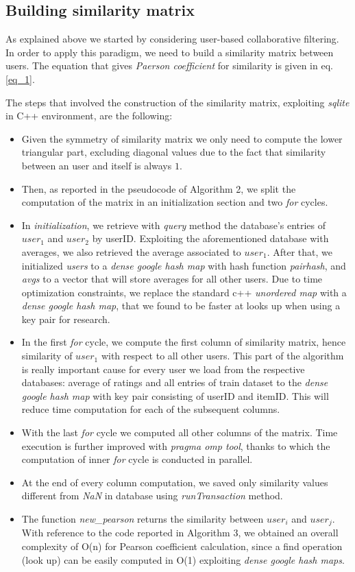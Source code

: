 \subsection{Building similarity matrix}

As explained above we started by considering user-based collaborative filtering. In order to apply this paradigm, we need to build a similarity matrix between users. The equation that gives \textit{Paerson coefficient} for similarity is given in eq. \ref{eq_1}.

The steps that involved the construction of the similarity matrix, exploiting \textit{sqlite} in C++ environment, are the following:

\begin{itemize}
	\item Given the symmetry of similarity matrix we only need to compute the lower triangular part, excluding diagonal values due to the fact that similarity between an user and itself is always $1$. 
	\item Then, as reported in the pseudocode of Algorithm 2, we split the computation of the matrix in an initialization section and two \textit{for} cycles.
	\item In \textit{initialization}, we retrieve with \textit{query} method the database's entries of $user_1$ and $user_2$ by userID. Exploiting the aforementioned database with averages, we also retrieved the average associated to $user_1$. After that, we initialized \textit{users} to a \textit{dense google hash map} with hash function \textit{pairhash}, and \textit{avgs} to a vector that will store averages for all other users.
	Due to time optimization constraints, we replace the standard c++ \textit{unordered map} with a \textit{dense google hash map}, that we found to be faster at looks up when using a key pair for research.
	\item In the first \textit{for} cycle, we compute the first column of similarity matrix, hence similarity of $user_1$ with respect to all other users. This part of the algorithm is really important cause for every user we load from the respective databases: average of ratings and all entries of train dataset to the \textit{dense google hash map} with key pair consisting of userID and itemID. This will reduce time computation for each of the subsequent columns.
	\item With the last \textit{for} cycle we computed all other columns of the matrix. Time execution is further improved with \textit{pragma omp tool}, thanks to which the computation of inner \textit{for} cycle is conducted in parallel.
	\item At the end of every column computation, we saved only similarity values different from \textit{NaN} in database using \textit{runTransaction} method.
	\item The function \textit{new\_pearson} returns the similarity between $user_i$ and $user_j$. With reference to the code reported in Algorithm 3, we obtained an overall complexity of O(n) for Pearson coefficient calculation, since a find operation (look up) can be easily computed in O(1) exploiting \textit{dense google hash maps}.
\end{itemize}

